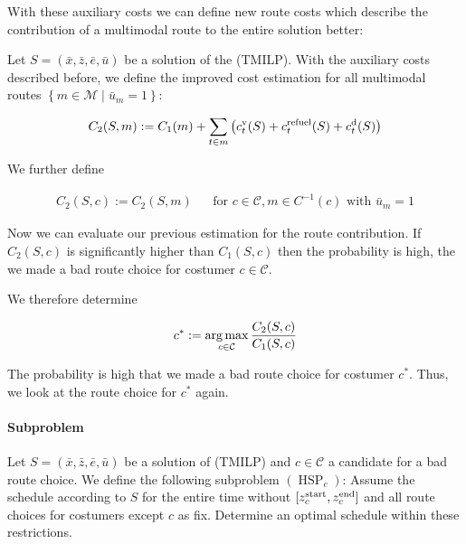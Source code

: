 With these auxiliary costs we can define new route costs which describe the contribution of a multimodal route to the entire solution better:

\begin{definition}

Let $S=\left(\bar{x},\bar{z},\bar{e},\bar{u}\right)$ be a solution of the (TMILP). With the auxiliary costs described before, we define the improved cost estimation for all multimodal routes $\left\{m\in\mathcal{M}\mid \bar{u}_m=1\right\}$:

\begin{align*}
	C_2(S,m) := C_1(m) + \sum_{t\in m}\left(c^{\operatorname{v}}_t(S) + c^{\operatorname{refuel}}_t(S) + c^{\operatorname{d}}_t(S)\right)
\end{align*}

We further define

\begin{align*}
	C_2(S,c) := C_2(S,m) && \text{for } c\in\mathcal{C},m\in C^{-1}(c) \text{ with } \bar{u}_m = 1
\end{align*}

\end{definition}

Now we can evaluate our previous estimation for the route contribution. If $C_2(S,c)$ is significantly higher than $C_1(S,c)$ then the probability is high, the we made a bad route choice for costumer $c\in\mathcal{C}$.

We therefore determine

\begin{align*}
	c^* := \operatorname*{arg\,max}_{c\in\mathcal{C}} \frac{C_2(S,c)}{C_1(S,c)}
\end{align*}

The probability is high that we made a bad route choice for costumer $c^*$. Thus, we look at the route choice for $c^*$ again.

\paragraph{Subproblem} \parfill

Let $S=\left(\bar{x},\bar{z},\bar{e},\bar{u}\right)$ be a solution of (TMILP) and $c\in\mathcal{C}$ a candidate for a bad route choice. We define the following subproblem $(\operatorname{HSP}_c)$: Assume the schedule according to $S$ for the entire time without $[z^{\operatorname{start}}_c,z^{\operatorname{end}}_c]$ and all route choices for costumers except $c$ as fix. Determine an optimal schedule within these restrictions.

